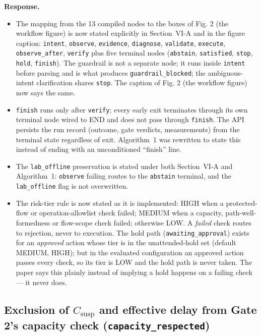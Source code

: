 \documentclass[11pt,a4paper]{article}
\newenvironment{response}{\par\noindent\begin{minipage}{\linewidth}\small\textbf{Response.}\par}{\end{minipage}\medskip\par}
\begin{document}
\begin{response}
\begin{itemize}
  \item The mapping from the 13 compiled nodes to the boxes of
    Fig. 2 (the workflow figure) is now stated explicitly in Section~VI-A and in
    the figure caption: \texttt{intent}, \texttt{observe}, \texttt{evidence},
    \texttt{diagnose}, \texttt{validate}, \texttt{execute},
    \texttt{observe\_after}, \texttt{verify} plus five terminal nodes
    (\texttt{abstain}, \texttt{satisfied}, \texttt{stop}, \texttt{hold},
    \texttt{finish}). The guardrail is not a separate node; it runs inside
    \texttt{intent} before parsing and is what produces
    \texttt{guardrail\_blocked}; the ambiguous-intent clarification shares
    \texttt{stop}. The caption of Fig. 2 (the workflow figure) now says the same.
  \item \texttt{finish} runs only after \texttt{verify}; every early exit
    terminates through its own terminal node wired to END and does not pass
    through \texttt{finish}. The API persists the run record (outcome, gate
    verdicts, measurements) from the terminal state regardless of exit.
    Algorithm~1 was rewritten to state this instead of ending with an
    unconditioned ``finish'' line.
  \item The \texttt{lab\_offline} preservation is stated under both
    Section~VI-A and Algorithm~1: \texttt{observe} failing routes to the
    \texttt{abstain} terminal, and the \texttt{lab\_offline} flag is not
    overwritten.
  \item The risk-tier rule is now stated as it is implemented: HIGH when a
    protected-flow or operation-allowlist check failed; MEDIUM when a
    capacity, path-well-formedness or flow-scope check failed; otherwise
    LOW. A \emph{failed} check routes to rejection, never to execution. The
    hold path (\texttt{awaiting\_approval}) exists for an \emph{approved}
    action whose tier is in the unattended-hold set (default MEDIUM, HIGH);
    but in the evaluated configuration an approved action passes every
    check, so its tier is LOW and the hold path is never taken. The paper
    says this plainly instead of implying a hold happens on a failing check
    --- it never does.
\end{itemize}
\end{response}

\subsection{Exclusion of $C_{\mathrm{susp}}$ and effective delay from Gate
2's capacity check (\texttt{capacity\_respected})}
\end{document}
